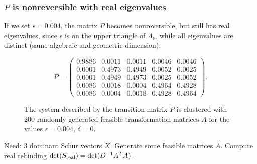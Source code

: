 \subsubsection*{$P$ is nonreversible with real eigenvalues}

If we set $\epsilon = 0.004$, the matrix $P$ becomes nonreversible, but still has real eigenvalues, since $\epsilon$ is on the upper triangle of $\Lambda_s$, while all eigenvalues are distinct (same algebraic and geometric dimension).

\begin{equation*}
	P = 
	\begin{pmatrix}
		0.9886  &  0.0011  	&  0.0011  	&  0.0046	& 0.0046 	\\
		0.0001 	&  0.4973  	&  0.4949  	&  0.0052  	& 0.0025	\\
		0.0001  &  0.4949	&  0.4973  	&  0.0025  	& 0.0052	\\
		0.0086  &  0.0018 	&  0.0004	&  0.4964  	& 0.4928	\\
		0.0086  &  0.0004	&  0.0018   &  0.4928  	& 0.4964
	\end{pmatrix}.
\end{equation*}

\begin{figure}[ht!]
	\centering
	\hspace{20pt}
	\caption{The system described by the transition matrix $P$ is clustered with $200$ randomly generated feasible transformation matrices $A$ for the values $\epsilon = 0.004$, $\delta = 0$.} %
\end{figure}

Need: $3$ dominant Schur vectors $X$. Generate some feasible matrices $A$. Compute real rebinding  $\det(S_{\mathrm{real}}) = \det(D^{-1} A^TA)$.

